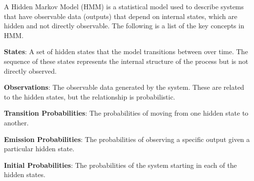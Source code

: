 \documentclass[11pt]{amsart}
\begin{document}
A Hidden Markov Model (HMM) is a statistical model used to describe systems that have observable data (outputs) that depend on internal states, which are hidden and not directly observable.
The following is a list of the key concepts in HMM.

\textbf{States}: A set of hidden states that the model transitions between over time.
The sequence of these states represents the internal structure of the process but is not directly observed.


\textbf{Observations}: The observable data generated by the system.
These are related to the hidden states, but the relationship is probabilistic.


\textbf{Transition Probabilities}: The probabilities of moving from one hidden state to another.


\textbf{Emission Probabilities}: The probabilities of observing a specific output given a particular hidden state.


\textbf{Initial Probabilities}: The probabilities of the system starting in each of the hidden states.

\end{document}
